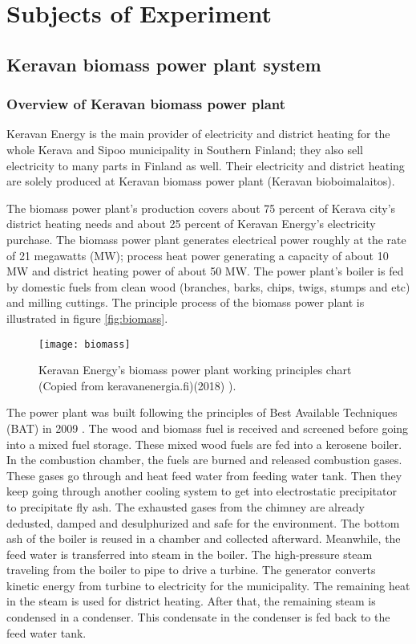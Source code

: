 
\chapter{Subjects of Experiment}

\section{Keravan biomass power plant system}

\subsection{Overview of Keravan biomass power plant}

Keravan Energy is the main provider of electricity and district heating for the whole Kerava and Sipoo municipality in Southern Finland; they also sell electricity to many parts in Finland as well. Their electricity and district heating are solely produced at Keravan biomass power plant (Keravan bioboimalaitos).\cite{kerava:web}

The biomass power plant's production covers about 75 percent of Kerava city's district heating needs and about 25 percent of Keravan Energy's electricity purchase. The biomass power plant generates electrical power roughly at the rate of 21 megawatts (MW); process heat power generating a capacity of about 10 MW and district heating power of about 50 MW. The power plant's boiler is fed by domestic fuels from clean wood (branches, barks, chips, twigs, stumps and etc) and milling cuttings. The principle process of the biomass power plant is illustrated in figure \vref{fig:biomass}.

\begin{figure}[h]
  \centering
  \texttt{[image: biomass]}
  \caption{ Keravan Energy's biomass power plant working principles chart (Copied from keravanenergia.fi)(2018) \cite{kerava:web}).}
  \label{fig:biomass}
\end{figure}

The power plant was built following the principles of Best Available Techniques (BAT) in 2009 \cite{kerava:web}. The wood and biomass fuel is received and screened before going into a mixed fuel storage. These mixed wood fuels are fed into a kerosene boiler. In the combustion chamber, the fuels are burned and released combustion gases. These gases go through and heat feed water from feeding water tank. Then they keep going through another cooling system to get into electrostatic precipitator to precipitate fly ash. The exhausted gases from the chimney are already dedusted, damped and desulphurized and safe for the environment. The bottom ash of the boiler is reused in a chamber and collected afterward. Meanwhile, the feed water is transferred into steam in the boiler. The high-pressure steam traveling from the boiler to pipe to drive a turbine. The generator converts kinetic energy from turbine to electricity for the municipality. The remaining heat in the steam is used for district heating. After that, the remaining steam is condensed in a condenser. This condensate in the condenser is fed back to the feed water tank.

